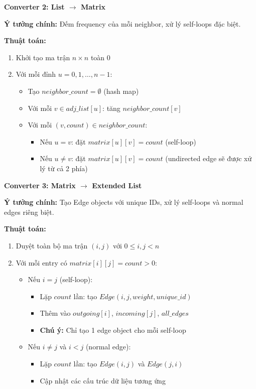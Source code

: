 \documentclass[12pt,a4paper]{article}
\begin{document}
\vspace{0.5cm}

\textbf{Converter 2: List $\rightarrow$ Matrix}

\textbf{Ý tưởng chính:} Đếm frequency của mỗi neighbor, xử lý self-loops đặc biệt.

\textbf{Thuật toán:}
\begin{enumerate}
    \item Khởi tạo ma trận $n \times n$ toàn $0$
    \item Với mỗi đỉnh $u = 0, 1, \ldots, n-1$:
    \begin{itemize}
        \item Tạo $neighbor\_count = \emptyset$ (hash map)
        \item Với mỗi $v \in adj\_list[u]$: tăng $neighbor\_count[v]$
        \item Với mỗi $(v, count) \in neighbor\_count$:
        \begin{itemize}
            \item Nếu $u = v$: đặt $matrix[u][v] = count$ (self-loop)
            \item Nếu $u \neq v$: đặt $matrix[u][v] = count$ (undirected edge sẽ được xử lý từ cả 2 phía)
        \end{itemize}
    \end{itemize}
\end{enumerate}


\vspace{0.5cm}

\textbf{Converter 3: Matrix $\rightarrow$ Extended List}

\textbf{Ý tưởng chính:} Tạo Edge objects với unique IDs, xử lý self-loops và normal edges riêng biệt.

\textbf{Thuật toán:}
\begin{enumerate}
    \item Duyệt toàn bộ ma trận $(i,j)$ với $0 \leq i,j < n$
    \item Với mỗi entry có $matrix[i][j] = count > 0$:
    \begin{itemize}
        \item Nếu $i = j$ (self-loop):
        \begin{itemize}
            \item Lặp $count$ lần: tạo $Edge(i,j,weight,unique\_id)$
            \item Thêm vào $outgoing[i]$, $incoming[j]$, $all\_edges$
            \item \textbf{Chú ý:} Chỉ tạo 1 edge object cho mỗi self-loop
        \end{itemize}
        \item Nếu $i \neq j$ và $i < j$ (normal edge):
        \begin{itemize}
            \item Lặp $count$ lần: tạo $Edge(i,j)$ và $Edge(j,i)$
            \item Cập nhật các cấu trúc dữ liệu tương ứng
        \end{itemize}
    \end{itemize}
\end{enumerate}
\end{document}
